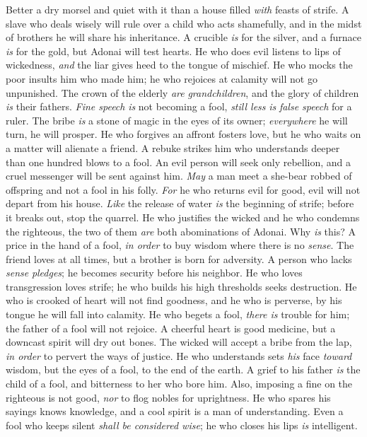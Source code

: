 \begin{biblechapter} %
\verse Better a dry morsel and quiet with it 
than a house filled \textit{with} feasts of strife.
\verse A slave who deals wisely will rule over a child who acts shamefully, 
and in the midst of brothers he will share his inheritance.
\verse A crucible \textit{is} for the silver, and a furnace \textit{is} for the gold, 
but Adonai will test hearts.
\verse He who does evil listens to lips of wickedness, 
\textit{and} the liar gives heed to the tongue of mischief.
\verse He who mocks the poor insults him who made him; 
he who rejoices at calamity will not go unpunished.
\verse The crown of the elderly \textit{are} \textit{grandchildren}, 
and the glory of children \textit{is} their fathers.
\verse \textit{Fine speech} \textit{is} not becoming a fool, 
\textit{still less} \textit{is} \textit{false speech} for a ruler.
\verse The bribe \textit{is} a stone of magic in the eyes of its owner; 
\textit{everywhere} he will turn, he will prosper.
\verse He who forgives an affront fosters love, 
but he who waits on a matter will alienate a friend.
\verse A rebuke strikes him who understands 
deeper than one hundred blows to a fool.
\verse An evil person will seek only rebellion, 
and a cruel messenger will be sent against him.
\verse \textit{May} a man meet a she-bear robbed of offspring 
and not a fool in his folly.
\verse \textit{For} he who returns evil for good, 
evil will not depart from his house.
\verse \textit{Like} the release of water \textit{is} the beginning of strife; 
before it breaks out, stop the quarrel.
\verse He who justifies the wicked and he who condemns the righteous, 
the two of them \textit{are} both abominations of Adonai.
\verse Why \textit{is} this? A price in the hand of a fool, 
\textit{in order} to buy wisdom where there is no \textit{sense}.
\verse The friend loves at all times, 
but a brother is born for adversity.
\verse A person who lacks \textit{sense} \textit{pledges}; 
he becomes security before his neighbor.
\verse He who loves transgression loves strife; 
he who builds his high thresholds seeks destruction.
\verse He who is crooked of heart will not find goodness, 
and he who is perverse, by his tongue he will fall into calamity.
\verse He who begets a fool, \textit{there is} trouble for him; 
the father of a fool will not rejoice.
\verse A cheerful heart is good medicine, 
but a downcast spirit will dry out bones.
\verse The wicked will accept a bribe from the lap, 
\textit{in order} to pervert the ways of justice.
\verse He who understands sets \textit{his} face \textit{toward} wisdom, 
but the eyes of a fool, to the end of the earth.
\verse A grief to his father \textit{is} the child of a fool, 
and bitterness to her who bore him.
\verse Also, imposing a fine on the righteous is not good, 
\textit{nor} to flog nobles for uprightness.
\verse He who spares his sayings knows knowledge, 
and a cool spirit is a man of understanding.
\verse Even a fool who keeps silent \textit{shall be considered wise}; 
he who closes his lips \textit{is} intelligent.
\end{biblechapter}


